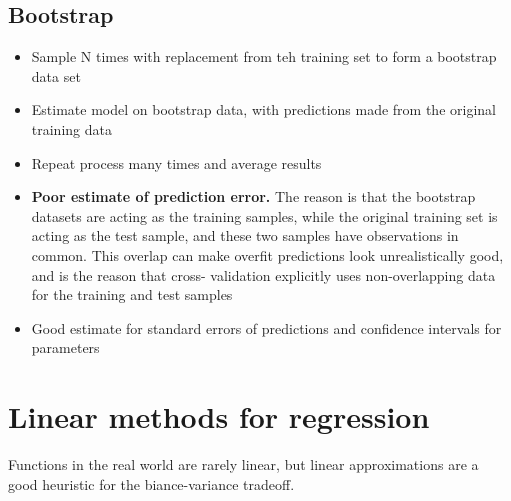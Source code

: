 \documentclass{article}
\begin{document}
\subsection{Bootstrap}
\begin{itemize}
  \item Sample N times with replacement from teh training set to form a bootstrap data set
  \item Estimate model on bootstrap data, with predictions made from the original training data
  \item Repeat process many times and average results
  \item \textbf{Poor estimate of prediction error.} The reason is that the bootstrap datasets are acting as the training samples, while the original training set is acting as the test sample, and these two samples have observations in common. This overlap can make overfit predictions look unrealistically good, and is the reason that cross- validation explicitly uses non-overlapping data for the training and test samples
  \item Good estimate for standard errors of predictions and confidence intervals for parameters
\end{itemize}


\section{Linear methods for regression}
Functions in the real world are rarely linear, but linear approximations are a good heuristic for the biance-variance tradeoff.
\end{document}
